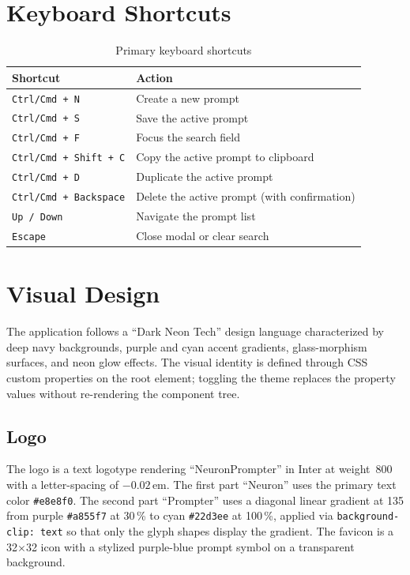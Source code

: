 \documentclass[a4paper, 11pt, oneside]{report}
\begin{document}
\section{Keyboard Shortcuts}
\label{sec:shortcuts}

\begin{table}[H]
  \centering
  \caption{Primary keyboard shortcuts}
  \label{tab:shortcuts}
  \begin{tabularx}{\textwidth}{l X}
    \toprule
    \textbf{Shortcut} & \textbf{Action} \\
    \midrule
    \texttt{Ctrl/Cmd + N}         & Create a new prompt \\
    \texttt{Ctrl/Cmd + S}         & Save the active prompt \\
    \texttt{Ctrl/Cmd + F}         & Focus the search field \\
    \texttt{Ctrl/Cmd + Shift + C} & Copy the active prompt to clipboard \\
    \texttt{Ctrl/Cmd + D}         & Duplicate the active prompt \\
    \texttt{Ctrl/Cmd + Backspace} & Delete the active prompt (with confirmation) \\
    \texttt{Up / Down}            & Navigate the prompt list \\
    \texttt{Escape}               & Close modal or clear search \\
    \bottomrule
  \end{tabularx}
\end{table}

\section{Visual Design}
\label{sec:visual-design}

The application follows a ``Dark Neon Tech'' design language characterized
by deep navy backgrounds, purple and cyan accent gradients, glass-morphism
surfaces, and neon glow effects.  The visual identity is defined through
CSS custom properties on the root element; toggling the theme replaces the
property values without re-rendering the component tree.

\subsection{Logo}

The logo is a text logotype rendering ``NeuronPrompter'' in Inter at
weight~800 with a letter-spacing of $-0.02$\,em.  The first part
``Neuron'' uses the primary text color \texttt{\#e8e8f0}.  The second part
``Prompter'' uses a diagonal linear gradient at 135\textdegree{} from
purple \texttt{\#a855f7} at 30\,\% to cyan \texttt{\#22d3ee} at 100\,\%,
applied via \texttt{background-clip:\,text} so that only the glyph shapes
display the gradient.  The favicon is a 32$\times$32 icon with a stylized
purple-blue prompt symbol on a transparent background.
\end{document}
